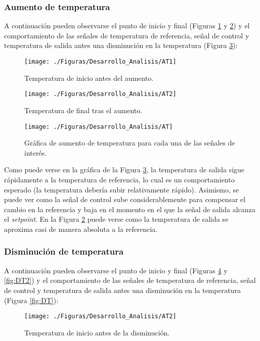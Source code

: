 \subsubsection{Aumento de temperatura}
A continuación pueden observarse el punto de inicio y final (Figuras \ref{fig:AT1} y \ref{fig:AT2}) y el comportamiento de las señales de temperatura de referencia, señal de control y temperatura de salida antes una disminución en la temperatura (Figura \ref{fig:AT}):

\begin{figure}[H]
\centering
\texttt{[image: ./Figuras/Desarrollo\_Analisis/AT1]}
\caption{Temperatura de inicio antes del aumento.} 
\label{fig:AT1}
\end{figure}

\begin{figure}[H]
\centering
\texttt{[image: ./Figuras/Desarrollo\_Analisis/AT2]}
\caption{Temperatura de final tras el aumento.} 
\label{fig:AT2}
\end{figure}

\begin{figure}[H]
\centering
\texttt{[image: ./Figuras/Desarrollo\_Analisis/AT]}
\caption{Gráfica de aumento de temperatura para cada una de las señales de interés.} 
\label{fig:AT}
\end{figure}

Como puede verse en la gráfica de la Figura \ref{fig:AT}, la temperatura de salida sigue rápidamente a la temperatura de referencia, lo cual es un comportamiento esperado (la temperatura debería subir relativamente rápido). Asimismo, se puede ver como la señal de control sube considerablemente para compensar el cambio en la referencia y baja en el momento en el que la señal de salida alcanza el \textit{setpoint}. En la Figura \ref{fig:AT2} puede verse como la temperatura de salida se aproxima casi de manera absoluta a la referencia. 

\subsubsection{Disminución de temperatura}
A continuación pueden observarse el punto de inicio y final (Figuras \ref{fig:DT1} y \ref{fig:DT2}) y el comportamiento de las señales de temperatura de referencia, señal de control y temperatura de salida antes una disminución en la temperatura (Figura \ref{fig:DT}): 

\begin{figure}[H]
\centering
\texttt{[image: ./Figuras/Desarrollo\_Analisis/AT2]}
\caption{Temperatura de inicio antes de la disminución.} 
\label{fig:DT1}
\end{figure}

